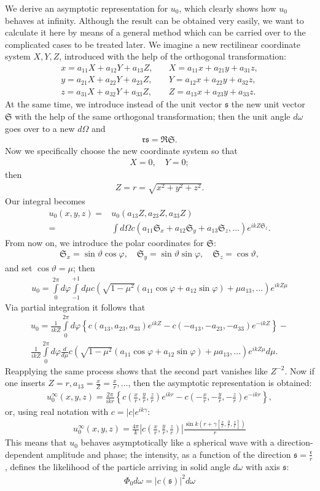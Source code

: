 \documentclass[a4paper,11pt]{article}
\newcommand{\?}[2]{#1\footnote{\textsc{Translator note}: #2}}
\newcommand{\nequ}[2]{\begin{align*}\tag{#1}#2\end{align*}}
\newcommand{\uequ}[1]{\begin{align*}#1\end{align*}}
\renewcommand{\exp}[1]{e^{#1}}
\newcommand{\dXdY}[2]{\frac{d{#1}}{{d{#2}}}}
\begin{document}
We derive an asymptotic representation for $u_0$, which clearly shows how $u_0$ behaves at infinity. Although the result can be obtained very easily, we want to calculate it here by means of a general method which can be carried over to the complicated cases to be treated later. We imagine a new rectilinear coordinate system $X, Y, Z$, introduced with the help of the orthogonal transformation:
\nequ{12}{
x = a_{11}X + a_{12}Y + a_{13}Z, \quad & X = a_{11} x + a_{21} y + a_{31}z,\\
y = a_{21}X + a_{22}Y + a_{23}Z, \quad & Y = a_{12} x + a_{22} y + a_{32}z,\\
z = a_{31}X + a_{32}Y + a_{33}Z, \quad & Z = a_{13} x + a_{23} y + a_{33}z.
}
At the same time, we introduce instead of the unit vector $\mathfrak{s}$ the new unit vector $\mathfrak{S}$ with the help of the same orthogonal transformation; then the unit angle $d\omega$ goes over to a new $d\Omega$ and
\nequ{13}{
\mathfrak{rs} = \mathfrak{RS}.
}
Now we specifically choose the new coordinate system so that
\nequ{14}{
X = 0,\quad Y = 0;
}
then
\nequ{15}{
Z = r = \sqrt{x^2 + y^2 + z^2}.
}
Our integral becomes
\uequ{
u_0(x,y,z) = & u_0(a_{13}Z, a_{23}Z, a_{33}Z)\\
           = & \int d\Omega c\left(a_{11}\mathfrak{S}_x + a_{12}\mathfrak{S}_y + a_{13}\mathfrak{S}_z, ... \right)\exp{ikZ\mathfrak{S}_z}.
}
From now on, we introduce the polar coordinates for $\mathfrak{S}$:
\nequ{16}{
\mathfrak{S}_x = \sin{\vartheta}\cos{\varphi},\quad
\mathfrak{S}_y = \sin{\vartheta}\sin{\varphi},\quad
\mathfrak{S}_z = \cos{\vartheta},
}
and set $\cos{\vartheta} = \mu$; then
\uequ{
u_0 = \int\limits_0^{2\pi}d\varphi\int\limits_{-1}^{+1}d\mu
c\left(\sqrt{1-\mu^2}
(a_{11}\cos{\varphi} + a_{12}\sin{\varphi}) + \mu a_{13}, ...
\right)\exp{ikZ\mu}
}
Via partial integration it follows that
\uequ{
u_0 = 
\frac{1}{ikZ}\int\limits_0^{2\pi}d\varphi\left\{
c(a_{13}, a_{23}, a_{33})\exp{ikZ} - 
c(-a_{13}, -a_{23}, -a_{33})\exp{-ikZ}\right\} - \\
\frac{1}{ikZ}\int\limits_0^{2\pi}d\varphi\dXdY{}{\mu}
c\left(\sqrt{1-\mu^2}(a_{11}\cos{\varphi} + a_{12}\sin{\varphi})
 + \mu a_{13}, ...\right)\exp{ikZ\mu} d\mu.
}
Reapplying the same process shows that the second part vanishes like $Z^{-2}$. Now if one inserts $Z=r, a_{13} = \frac{x}{Z} = \frac{x}{r}, \dots$, then the asymptotic representation is obtained:
\nequ{17}{
u_0^\infty(x,y,z) = \frac{2\pi}{ikr}\left\{
c\left(\frac{x}{r},\frac{y}{r},\frac{z}{r}\right)\exp{ikr} - 
c\left(-\frac{x}{r}, -\frac{y}{r}, -\frac{z}{r}\right)\exp{-ikr}
\right\},
}
or, using real notation with $c=|c|\exp{ik\gamma}$:
\nequ{18}{
u_0^\infty(x,y,z) = \frac{4\pi}{k}\left|
c\left(\frac{x}{r},\frac{y}{r},\frac{z}{r}\right)\right|
\frac{\sin{k}\left(r + \gamma\left[\frac{x}{r},\frac{y}{r},\frac{z}{r}\right]\right)
}{r}
}
This means that $u_0$ behaves asymptotically like a spherical wave with a direction-dependent amplitude and phase; the intensity, as a function of the direction $\mathfrak{s} = \frac{\mathfrak{r}}{r}$, defines the likelihood of the particle arriving in solid angle $d\omega$ with axis $\mathfrak{s}$:
\nequ{19}{
\Phi_0 d\omega = \left|c(\mathfrak{s})\right|^2 d\omega
}
\end{document}
